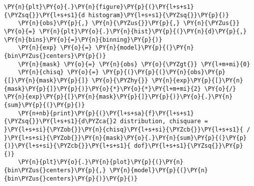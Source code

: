 \begin{Verbatim}[label=\makebox{\href{https://github.com/unipi-physics-labs/lab1-sheets/tree/main/snippy/random_walk.py}{https://github.com/.../random\_walk.py}},commandchars=\\\{\}]
    \PY{n}{plt}\PY{o}{.}\PY{n}{figure}\PY{p}{(}\PY{l+s+s1}{\PYZsq{}}\PY{l+s+s1}{d histogram}\PY{l+s+s1}{\PYZsq{}}\PY{p}{)}
    \PY{n}{obs}\PY{p}{,} \PY{n}{\PYZus{}}\PY{p}{,} \PY{n}{\PYZus{}} \PY{o}{=} \PY{n}{plt}\PY{o}{.}\PY{n}{hist}\PY{p}{(}\PY{n}{d}\PY{p}{,} \PY{n}{bins}\PY{o}{=}\PY{n}{binning}\PY{p}{)}
    \PY{n}{exp} \PY{o}{=} \PY{n}{model}\PY{p}{(}\PY{n}{bin\PYZus{}centers}\PY{p}{)}
    \PY{n}{mask} \PY{o}{=} \PY{n}{obs} \PY{o}{\PYZgt{}} \PY{l+m+mi}{0}
    \PY{n}{chisq} \PY{o}{=} \PY{p}{(}\PY{p}{(}\PY{n}{obs}\PY{p}{[}\PY{n}{mask}\PY{p}{]} \PY{o}{\PYZhy{}} \PY{n}{exp}\PY{p}{[}\PY{n}{mask}\PY{p}{]}\PY{p}{)}\PY{o}{*}\PY{o}{*}\PY{l+m+mi}{2} \PY{o}{/} \PY{n}{exp}\PY{p}{[}\PY{n}{mask}\PY{p}{]}\PY{p}{)}\PY{o}{.}\PY{n}{sum}\PY{p}{(}\PY{p}{)}
    \PY{n+nb}{print}\PY{p}{(}\PY{l+s+sa}{f}\PY{l+s+s1}{\PYZsq{}}\PY{l+s+s1}{d\PYZca{}2 distribution, chisquare = }\PY{l+s+si}{\PYZob{}}\PY{n}{chisq}\PY{l+s+si}{\PYZcb{}}\PY{l+s+s1}{ / }\PY{l+s+si}{\PYZob{}}\PY{n}{mask}\PY{o}{.}\PY{n}{sum}\PY{p}{(}\PY{p}{)}\PY{l+s+si}{\PYZcb{}}\PY{l+s+s1}{ dof}\PY{l+s+s1}{\PYZsq{}}\PY{p}{)}
    \PY{n}{plt}\PY{o}{.}\PY{n}{plot}\PY{p}{(}\PY{n}{bin\PYZus{}centers}\PY{p}{,} \PY{n}{model}\PY{p}{(}\PY{n}{bin\PYZus{}centers}\PY{p}{)}\PY{p}{)}


\end{Verbatim}
